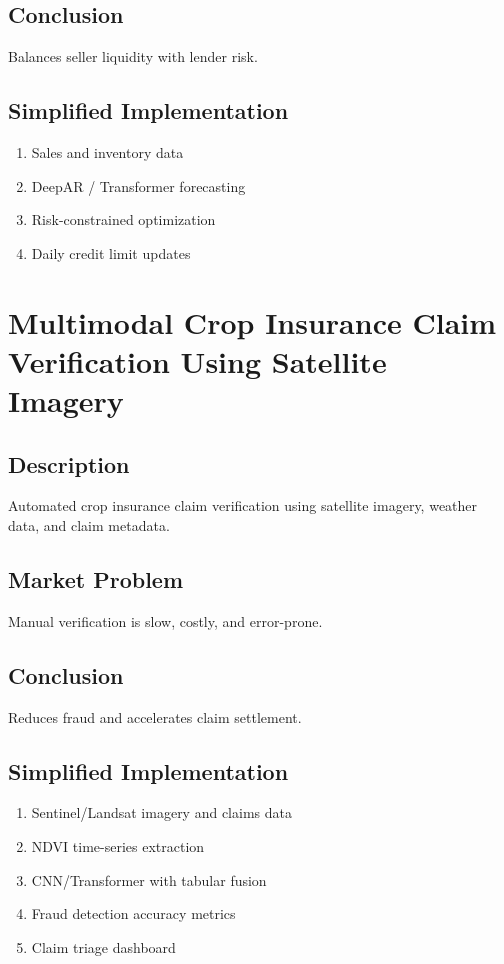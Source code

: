 \documentclass[11pt,a4paper]{article}
\begin{document}
\subsection*{Conclusion}
Balances seller liquidity with lender risk.

\subsection*{Simplified Implementation}
\begin{enumerate}[noitemsep]
    \item Sales and inventory data
    \item DeepAR / Transformer forecasting
    \item Risk-constrained optimization
    \item Daily credit limit updates
\end{enumerate}

\section{Multimodal Crop Insurance Claim Verification Using Satellite Imagery}

\subsection*{Description}
Automated crop insurance claim verification using satellite imagery, weather data, and claim metadata.

\subsection*{Market Problem}
Manual verification is slow, costly, and error-prone.

\subsection*{Conclusion}
Reduces fraud and accelerates claim settlement.

\subsection*{Simplified Implementation}
\begin{enumerate}[noitemsep]
    \item Sentinel/Landsat imagery and claims data
    \item NDVI time-series extraction
    \item CNN/Transformer with tabular fusion
    \item Fraud detection accuracy metrics
    \item Claim triage dashboard
\end{enumerate}
\end{document}
